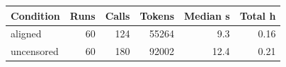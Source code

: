 \begin{tabular}{lrrrrr}
\toprule
Condition & Runs & Calls & Tokens & Median s & Total h \\
\midrule
aligned & 60 & 124 & 55264 & 9.3 & 0.16 \\
uncensored & 60 & 180 & 92002 & 12.4 & 0.21 \\
\bottomrule
\end{tabular}
